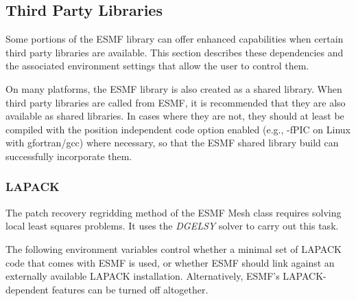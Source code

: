 \subsection{Third Party Libraries}
\label{sec:ThirdParty}

Some portions of the ESMF library can offer enhanced capabilities when
certain third party libraries are available. This section describes
these dependencies and the associated environment settings
that allow the user to control them.

On many platforms, the ESMF library is also created as a shared library.
When third party libraries are called from ESMF, it is recommended that they are
also available as shared libraries.  In cases where they are not, they should at
least be compiled with the position independent code option enabled (e.g., -fPIC on
Linux with gfortran/gcc) where necessary, so that the ESMF shared library
build can successfully incorporate them.

\subsubsection{LAPACK}
\label{sec:lapack}
The patch recovery regridding method of the ESMF Mesh class requires solving
local least squares problems. It uses the
 {\it DGELSY} solver
to carry out this task.

The following environment variables control whether a minimal set of
LAPACK code that comes with ESMF is used, or whether ESMF should link against
an externally available LAPACK installation. Alternatively, ESMF's
LAPACK-dependent features can be turned off altogether.

